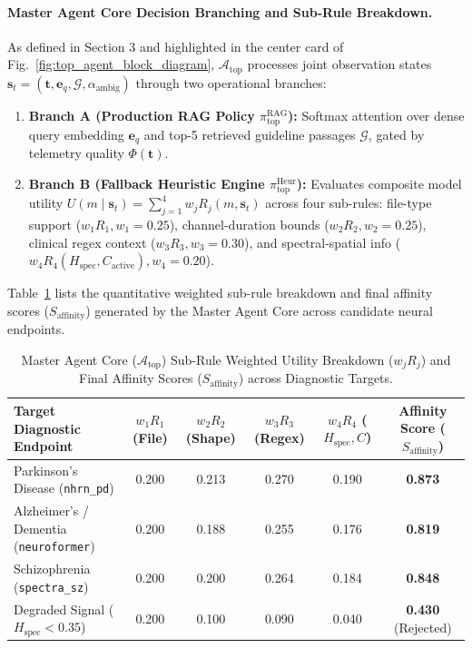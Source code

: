 \documentclass[runningheads]{llncs}
\begin{document}
\paragraph{Master Agent Core Decision Branching and Sub-Rule Breakdown.}
As defined in Section 3 and highlighted in the center card of Fig.~\ref{fig:top_agent_block_diagram}, $\mathcal{A}_{\text{top}}$ processes joint observation states $\mathbf{s}_t = (\mathbf{t}, \mathbf{e}_q, \mathcal{G}, \alpha_{\text{ambig}})$ through two operational branches:
\begin{enumerate}
    \item \textbf{Branch A (Production RAG Policy $\pi_{\text{top}}^{\text{RAG}}$):} Softmax attention over dense query embedding $\mathbf{e}_q$ and top-5 retrieved guideline passages $\mathcal{G}$, gated by telemetry quality $\Phi(\mathbf{t})$.
    \item \textbf{Branch B (Fallback Heuristic Engine $\pi_{\text{top}}^{\text{Heur}}$):} Evaluates composite model utility $U(m \mid \mathbf{s}_t) = \sum_{j=1}^4 w_j R_j(m, \mathbf{s}_t)$ across four sub-rules: file-type support ($w_1 R_1, w_1=0.25$), channel-duration bounds ($w_2 R_2, w_2=0.25$), clinical regex context ($w_3 R_3, w_3=0.30$), and spectral-spatial info ($w_4 R_4(H_{\text{spec}}, C_{\text{active}}), w_4=0.20$).
\end{enumerate}

Table~\ref{tab:top_agent_scores} lists the quantitative weighted sub-rule breakdown and final affinity scores ($S_{\text{affinity}}$) generated by the Master Agent Core across candidate neural endpoints.

\begin{table}[t]
\centering
\caption{Master Agent Core ($\mathcal{A}_{\text{top}}$) Sub-Rule Weighted Utility Breakdown ($w_j R_j$) and Final Affinity Scores ($S_{\text{affinity}}$) across Diagnostic Targets.}
\label{tab:top_agent_scores}
\begin{tabular}{lccccc}
\toprule
\textbf{Target Diagnostic Endpoint} & \textbf{$w_1 R_1$ (File)} & \textbf{$w_2 R_2$ (Shape)} & \textbf{$w_3 R_3$ (Regex)} & \textbf{$w_4 R_4$ ($H_{\text{spec}}, C$)} & \textbf{Affinity Score ($S_{\text{affinity}}$)} \\ \midrule
Parkinson's Disease (\texttt{nhrn\_pd}) & 0.200 & 0.213 & 0.270 & 0.190 & \textbf{0.873} \\
Alzheimer's / Dementia (\texttt{neuroformer}) & 0.200 & 0.188 & 0.255 & 0.176 & \textbf{0.819} \\
Schizophrenia (\texttt{spectra\_sz}) & 0.200 & 0.200 & 0.264 & 0.184 & \textbf{0.848} \\
Degraded Signal ($H_{\text{spec}} < 0.35$) & 0.200 & 0.100 & 0.090 & 0.040 & \textbf{0.430} (Rejected) \\ \bottomrule
\end{tabular}
\end{table}
\end{document}
